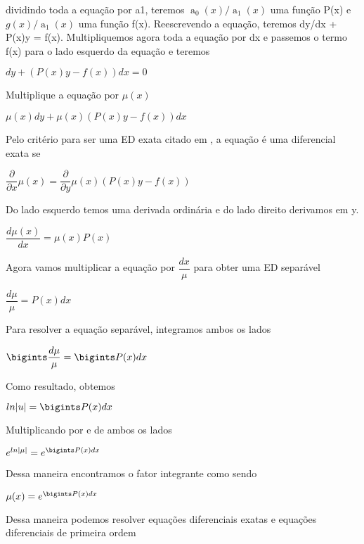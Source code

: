 dividindo toda a equação por a1, teremos   $ \operatorname{a}_{0}(x)/\operatorname{a}_{1}(x) $  uma função P(x)  e $ g(x)/\operatorname{a}_{1}(x) $ uma função f(x). 
Reescrevendo a equação, teremos dy/dx + P(x)y = f(x). Multipliquemos agora toda a equação por dx e passemos o termo f(x) para o lado esquerdo da equação e teremos
\begin{center}
$ dy + (P(x)y - f(x))dx = 0 $
\end{center}

Multiplique a equação por $\mu(x)$

\begin{center}
$\mu(x)dy + \mu(x)(P(x)y - f(x))dx $
\end{center}

Pelo critério para ser uma ED exata citado em \cite{explicacaoEDO}, a equação é uma diferencial exata se 

\begin{center}
$ \dfrac{\partial}{\partial x}\mu(x) = \dfrac{\partial}{\partial y}\mu(x)(P(x)y - f(x))  $ 
\end{center}


Do lado esquerdo temos uma derivada ordinária e do lado direito derivamos em y. 

\begin{center}
$ \dfrac{d\mu(x)}{dx} = \mu(x)P(x) $
\end{center}

Agora vamos multiplicar a equação por $ \dfrac{dx}{\mu} $ para obter uma ED separável

\begin{center}
$ \dfrac{d\mu}{\mu} = P(x)dx $
\end{center}


Para resolver a equação separável, integramos ambos os lados

\begin{center}
$ \bigints \dfrac{d\mu}{\mu} = \bigints P(x)dx $
\end{center}

Como resultado, obtemos

\begin{center}
$ ln|u| =  \bigints P(x)dx $
\end{center}

Multiplicando por e de ambos os lados

\begin{center}
$ e^{ln|\mu|} = e^{\bigints P(x)dx} $
\end{center}

Dessa maneira encontramos o fator integrante como sendo

\begin{center}
$ \mu(x) = e^{\bigints P(x)dx} $
\end{center}

Dessa maneira podemos resolver equações diferenciais exatas e equações diferenciais de primeira ordem
